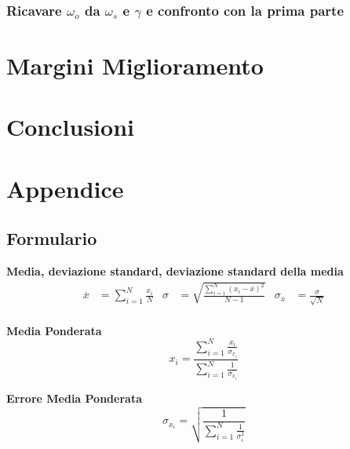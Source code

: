 \documentclass[a4paper,11pt,oneside]{article}
\begin{document}
\subsubsection{Ricavare $\omega_o$ da $\omega_s$ e $\gamma$ e confronto con la prima parte}












\section{Margini Miglioramento}
\section{Conclusioni}
\section{Appendice}
\subsection{Formulario}
\textbf{Media, deviazione standard, deviazione standard della media}
\begin{align*}
        \overline{x}&=\sum\limits_{i=1}^{N} \frac{x_{i}}{N}&
        \sigma&=\sqrt{\frac{\sum\limits_{i=1}^{N} (x_{i}-\overline{x})^2}{N-1}}&
        \sigma_{\overline{x}}&=\frac{\sigma}{\sqrt{N}}
\end{align*}\\

\textbf{Media Ponderata}
\begin{equation*}
\label{eq:media_pond}
    x_i=\frac{\sum_{i=1}^{N}\frac{x_i}{\sigma_{x_i}}}{\sum_{i=1}^{N}\frac{1}{\sigma_{x_i}}}
\end{equation*}

\textbf{Errore Media Ponderata}
\begin{equation*}
\label{eq:errore_media_pond}
     \sigma_{x_i}=\sqrt{\frac{1}{\sum_{i=1}^{N}\frac{1}{\sigma_{i}^{2}}}}
\end{equation*}
\end{document}
